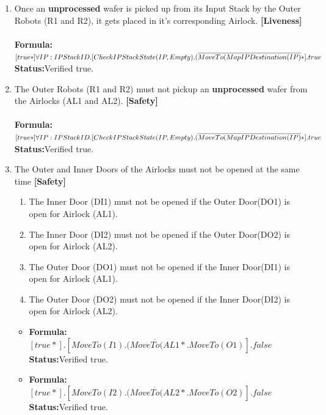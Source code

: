 \documentclass[a4paper,12pt]{article}
\begin{document}
\begin{enumerate}
\item Once an \textbf{unprocessed} wafer is picked up from its Input Stack by the Outer Robots (R1 and R2), it gets placed in it's corresponding Airlock. \textbf{[Liveness]}
\\
\\\textbf{Formula:} $[true*] \forall IP: IPStackID.[CheckIPStackState(IP, Empty).
\\(\overline{MoveTo(MapIPDestination(IP)}*].true$ \\\textbf{Status:}Verified true.

\item The Outer Robots (R1 and R2) must not pickup an \textbf{unprocessed} wafer from the Airlocks (AL1 and AL2). \textbf{[Safety]}
\\
\\\textbf{Formula:} $[true*] \forall IP: IPStackID.[CheckIPStackState(IP, Empty).
\\(\overline{MoveTo(MapIPDestination(IP)}*].true$ \\\textbf{Status:}Verified true.

\item The Outer and Inner Doors of the Airlocks must not be opened at the same time \textbf{[Safety]}
\begin{enumerate}
    \item The Inner Door (DI1) must not be opened if the Outer Door(DO1) is open for Airlock (AL1).

    \item The Inner Door (DI2) must not be opened if the Outer Door(DO2) is open for Airlock (AL2).

    \item The Outer Door (DO1) must not be opened if the Inner Door(DI1) is open for Airlock (AL1).

    \item The Outer Door (DO2) must not be opened if the Inner Door(DI2) is open for Airlock (AL2).
\end{enumerate}
    \begin{itemize}
	\item \textbf{Formula:} $[true*].[MoveTo(I1).(\overline{MoveTo(AL1}*.MoveTo(O1)].false$ \\\textbf{Status:}Verified true.
    \item \textbf{Formula:} $[true*].[MoveTo(I2).(\overline{MoveTo(AL2}*.MoveTo(O2)].false$ \\\textbf{Status:}Verified true.
	\end{itemize}


\end{enumerate}
\end{document}
